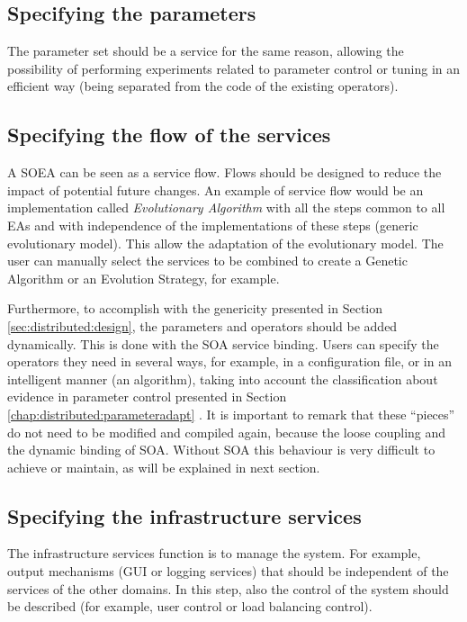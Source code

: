 \subsection{Specifying the parameters}
The parameter set should be a service for the same reason, allowing the possibility of performing
experiments related to  parameter control or tuning \cite{ParameterControlEiben07} in an efficient way
(being separated from the code of the existing operators). 

\subsection{Specifying the flow of the services}
\label{subsec:soaea:flows}
A SOEA can be seen as a service flow. Flows should be designed to reduce the impact of potential future changes. An example of service flow would be an implementation called {\em Evolutionary Algorithm} with all the steps common to all EAs and with independence of the implementations of these steps (generic evolutionary model). This allow the adaptation of the evolutionary model. The user can manually
  select the services to be combined to create a Genetic Algorithm or
  an Evolution Strategy, for example.  


  Furthermore, to accomplish with the genericity presented in Section \ref{sec:distributed:design}, the parameters and operators should be added dynamically. This is done with the SOA service binding. Users can specify the operators they need in several ways, for example, in a configuration file, or in an intelligent manner (an algorithm), taking into account the classification about evidence in parameter control presented in Section \ref{chap:distributed:parameteradapt} . It is important to remark that these ``pieces'' do not need to be modified and compiled again, because the loose coupling and the dynamic binding of SOA. Without SOA this behaviour is very difficult to achieve or maintain, as will be explained in next section.

\subsection{Specifying the infrastructure services}
The infrastructure services function is to manage the system. For example, output mechanisms (GUI or logging services) that should be independent of the services of the other domains. In this step, also the control of the system should be described (for example, user control or load balancing control).





